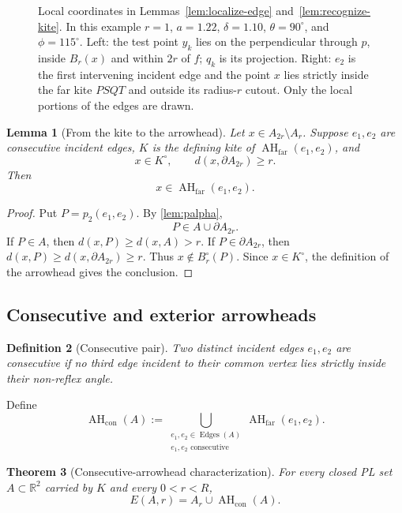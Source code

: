 \documentclass[11pt]{article}
\newtheorem{theorem}{Theorem}[section]
\newtheorem{lemma}[theorem]{Lemma}
\newtheorem{definition}[theorem]{Definition}
\newcommand{\R}{\mathbb R}
\newcommand{\Edges}{\operatorname{Edges}}
\newcommand{\AHcon}{\operatorname{AH}_{\mathrm{con}}}
\newcommand{\AHfar}{\operatorname{AH}_{\mathrm{far}}}
\numberwithin{equation}{section}
\begin{document}
\begin{figure}[!htbp]
\begin{tikzpicture}[scale=0.9,line join=round,line cap=round,every node/.style={font=\small}]
\end{tikzpicture}
\caption{Local coordinates in Lemmas~\ref{lem:localize-edge} and~\ref{lem:recognize-kite}. In this example $r=1$, $a=1.22$, $\delta=1.10$, $\theta=90^\circ$, and $\phi=115^\circ$. Left: the test point $y_k$ lies on the perpendicular through $p$, inside $B_r(x)$ and within $2r$ of $f$; $q_k$ is its projection. Right: $e_2$ is the first intervening incident edge and the point $x$ lies strictly inside the far kite $PSQT$ and outside its radius-$r$ cutout. Only the local portions of the edges are drawn.}
\label{fig:localization-kite}
\end{figure}

\begin{lemma}[From the kite to the arrowhead]\label{lem:kite-to-arrowhead}
Let $x\in A_{2r}\setminus A_r$. Suppose $e_1,e_2$ are consecutive incident edges, $K$ is the defining kite of $\AHfar(e_1,e_2)$, and
\[
x\in K^\circ,
\qquad
d(x,\partial A_{2r})\ge r.
\]
Then
\[
\boxed{x\in\AHfar(e_1,e_2).}
\]
\end{lemma}

\begin{proof}
Put $P=p_2(e_1,e_2)$. By \cref{lem:palpha},
\[
P\in A\cup\partial A_{2r}.
\]
If $P\in A$, then $d(x,P)\ge d(x,A)>r$. If $P\in\partial A_{2r}$, then $d(x,P)\ge d(x,\partial A_{2r})\ge r$. Thus $x\notin B_r^\circ(P)$. Since $x\in K^\circ$, the definition of the arrowhead gives the conclusion.
\end{proof}

\subsection{Consecutive and exterior arrowheads}

\begin{definition}[Consecutive pair]\label{def:consecutive}
Two distinct incident edges $e_1,e_2$ are \emph{consecutive} if no third edge incident to their common vertex lies strictly inside their non-reflex angle.
\end{definition}

Define
\[
\AHcon(A)
:=
\bigcup_{\substack{e_1,e_2\in\Edges(A)\\
 e_1,e_2\text{ consecutive}}}
\AHfar(e_1,e_2).
\]

\begin{theorem}[Consecutive-arrowhead characterization]\label{thm:consecutive-characterization}
For every closed PL set $A\subset\R^2$ carried by $K$ and every $0<r<R$,
\[
\boxed{E(A,r)=A_r\cup\AHcon(A).}
\]
\end{theorem}
\end{document}
